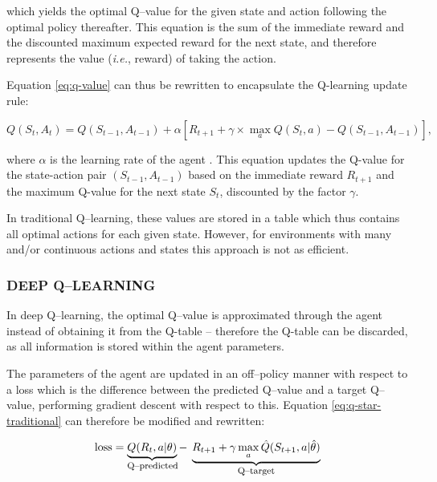 \documentclass{article}
\let\oldcite\cite
\renewcommand{\cite}[1]{\textbf{\oldcite{#1}}}
\renewenvironment{leftbar}[1][\hsize]{
    \def\FrameCommand{{\color{barcolor}\vrule width 0.5pt \hspace{10pt}}}
    \MakeFramed{\hsize#1 \advance\hsize-\width \FrameRestore}
}{\endMakeFramed}
\newcommand{\explain}[2]{\underbrace{#1}_{\parbox{\widthof{\ensuremath{#1}}}{\footnotesize\centering #2}}}
\begin{document}
\begin{leftbar}
    which yields the optimal Q–value for the given state and action following the optimal policy thereafter. This equation is the sum of the immediate reward and the discounted maximum expected reward for the next state, and therefore represents the value (\textit{i.e.}, reward) of taking the action. \cite{Q-intro} \cite{Human-level} \cite{Technical-Q-learning}

    Equation \eqref{eq:q-value} can thus be rewritten to encapsulate the Q-learning update rule:

    \begin{equation}
        Q(S_t, A_t) = Q(S_{t-1}, A_{t-1}) + \alpha \left[ R_{t+1} + \gamma \times \max_a Q(S_t, a) - Q(S_{t-1}, A_{t-1}) \right] \label{eq:q-star-traditional},
    \end{equation}

    where $\alpha$ is the learning rate of the agent \cite{Q-deep} \cite{Human-level}. This equation updates the Q-value for the state-action pair $(S_{t-1}, A_{t-1})$ based on the immediate reward $R_{t+1}$ and the maximum Q-value for the next state $S_t$, discounted by the factor $\gamma$.

    In traditional Q–learning, these values are stored in a table which thus contains all optimal actions for each given state. However, for environments with many and/or continuous actions and states this approach is not as efficient.

    \subsubsection*{DEEP Q–LEARNING}

    In deep Q–learning, the optimal Q–value is approximated through the agent instead of obtaining it from the Q-table – therefore the Q-table can be discarded, as all information is stored within the agent parameters.

    The parameters of the agent are updated in an off–policy manner with respect to a loss which is the difference between the predicted Q–value and a target Q–value, performing gradient descent with respect to this. \cite{Q-deep} Equation \eqref{eq:q-star-traditional} can therefore be modified and rewritten:

    \begin{equation*}
        \text{loss} = \explain{Q(R_t, a | \theta)}{\text{Q–predicted}} - \explain{R_{t+1} + \gamma \max_a \Hat{Q}(S_{t+1}, a | \Hat{\theta})}{\text{Q–target}}
    \end{equation*}


\end{leftbar}
\end{document}
